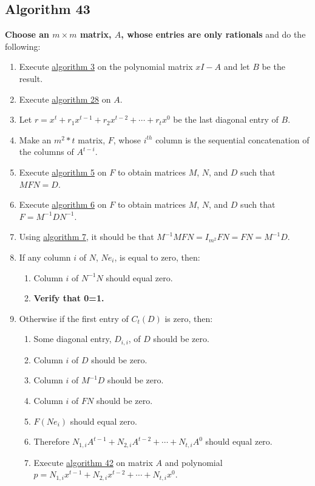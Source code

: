 \documentclass[twocolumn]{article}
\begin{document}
		\subsection{Algorithm 43}\label{sec:algorithm 43}
			\textbf{Choose an $m\times m$ matrix, $A$, whose entries are only rationals} and do the following:
			\begin{enumerate}
				\item Execute \hyperref[sec:algorithm 3]{algorithm 3} on the polynomial matrix $xI-A$ and let $B$ be the result.
				\item Execute \hyperref[sec:algorithm 28]{algorithm 28} on $A$.
				\item Let $r=x^t+r_1x^{t-1}+r_2x^{t-2}+\cdots+r_tx^0$ be the last diagonal entry of $B$.
				\item Make an $m^2*t$ matrix, $F$, whose $i^{th}$ column is the sequential concatenation of the columns of $A^{t-i}$.
				\item Execute \hyperref[sec:algorithm 5]{algorithm 5} on $F$ to obtain matrices $M$, $N$, and $D$ such that $MFN=D$.
				\item Execute \hyperref[sec:algorithm 6]{algorithm 6} on $F$ to obtain matrices $M$, $N$, and $D$ such that $F=M^{-1}DN^{-1}$.
				\item Using \hyperref[sec:algorithm 7]{algorithm 7}, it should be that $M^{-1}MFN=I_{m^2}FN=FN=M^{-1}D$.
				\item If any column $i$ of $N$, $Ne_i$, is equal to zero, then:
				\begin{enumerate}
					\item Column $i$ of $N^{-1}N$ should equal zero.
					\item \textbf{Verify that 0=1.}
				\end{enumerate}
				\item Otherwise if the first entry of $C_t(D)$ is zero, then:
				\begin{enumerate}
					\item Some diagonal entry, $D_{i,i}$, of $D$ should be zero.
					\item Column $i$ of $D$ should be zero.
					\item Column $i$ of $M^{-1}D$ should be zero.
					\item Column $i$ of $FN$ should be zero.
					\item $F(Ne_i)$ should equal zero.
					\item Therefore $N_{1,i}A^{t-1}+N_{2,i}A^{t-2}+\cdots+N_{t,i}A^0$ should equal zero.
					\item Execute \hyperref[sec:algorithm 42]{algorithm 42} on matrix $A$ and polynomial $p=N_{1,i}x^{t-1}+N_{2,i}x^{t-2}+\cdots+N_{t,i}x^0$.

\end{enumerate}
\end{enumerate}
\end{document}
